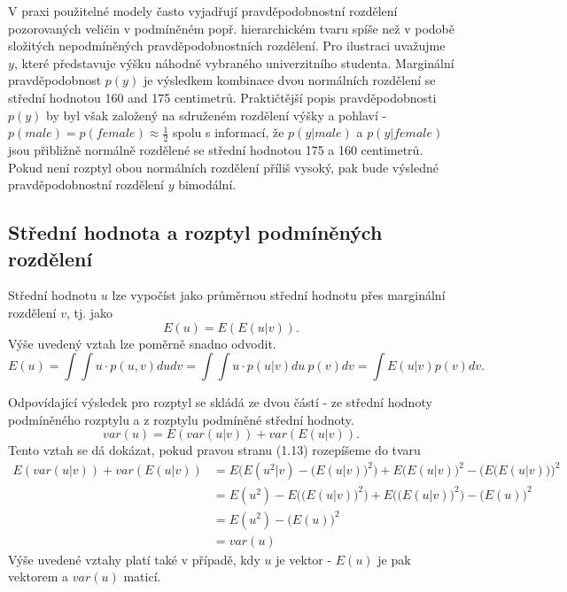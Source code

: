 V praxi použitelné modely často vyjadřují pravděpodobnostní rozdělení pozorovaných veličin v podmíněném popř. hierarchickém tvaru spíše než v podobě složitých nepodmíněných pravděpodobnostních rozdělení. Pro ilustraci uvažujme $y$, které představuje výšku náhodně vybraného univerzitního studenta. Marginální pravděpodobnost $p(y)$ je výsledkem kombinace dvou normálních rozdělení se střední hodnotou 160 and 175 centimetrů. Praktičtější popis pravděpodobnosti $p(y)$ by byl však založený na sdruženém rozdělení výšky a pohlaví - $p(\textit{male}) = p(\textit{female}) \approx \frac{1}{2}$ spolu s informací, že $p(y|\textit{male})$ a $p(y|\textit{female})$ jsou přibližně normálně rozdělené se střední hodnotou 175 a 160 centimetrů. Pokud není rozptyl obou normálních rozdělení příliš vysoký, pak bude výsledné pravděpodobnostní rozdělení $y$ bimodální.

\subsection{Střední hodnota a rozptyl podmíněných rozdělení}

Střední hodnotu $u$ lze vypočíst jako průměrnou střední hodnotu přes marginální rozdělení $v$, tj. jako
\begin{equation}
E(u) = E(E(u|v)).
\end{equation}
Výše uvedený vztah lze poměrně snadno odvodit.
\begin{equation}
E(u) = \int \int u \cdot p(u, v) du dv = \int \int u \cdot p(u | v) du ~ p(v) dv = \int E(u|v)p(v)dv.
\end{equation}

Odpovídající výsledek pro rozptyl se skládá ze dvou částí - ze střední hodnoty podmíněného rozptylu a z rozptylu podmíněné střední hodnoty.
\begin{equation}
var(u) = E(var(u | v)) + var(E(u | v)).
\end{equation}
Tento vztah se dá dokázat, pokud pravou stranu (1.13) rozepíšeme do tvaru
\begin{equation}
\begin{split}
E(var(u|v)) + var(E(u|v)) & = E\Big(E(u^2|v) - \big(E(u|v)\big)^2\Big) + E\big(E(u|v)\big)^2 - \Big(E\big(E(u|v)\big)\Big)^2\\
 & = E(u^2) - E\Big(\big(E(u|v)\big)^2\Big) + E\Big(\big(E(u|v)\big)^2\Big) - \Big(E(u)\Big)^2\\
 & = E(u^2) - \Big(E(u)\Big)^2\\
 & = var(u)
\end{split}
\end{equation}
Výše uvedené vztahy platí také v případě, kdy $u$ je vektor - $E(u)$ je pak vektorem a $var(u)$ maticí.

